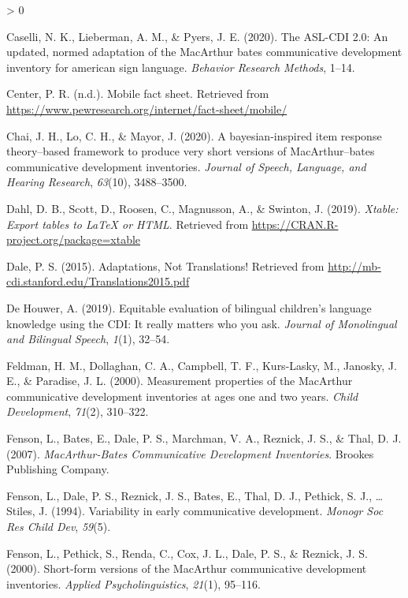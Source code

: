 \documentclass[
  english,
  ,man,floatsintext]{apa6}
\newlength{\cslhangindent}
\newenvironment{CSLReferences}[2] %
 {%
  \setlength{\parindent}{0pt}
  \ifodd #1 \everypar{\setlength{\hangindent}{\cslhangindent}}\ignorespaces\fi
  \ifnum #2 > 0
  \setlength{\parskip}{#2\baselineskip}
  \fi
 }%
 {}
\begin{document}
\begin{CSLReferences}{1}{0}
\leavevmode\hypertarget{ref-Caselli2020}{}%
Caselli, N. K., Lieberman, A. M., \& Pyers, J. E. (2020). The ASL-CDI 2.0: An updated, normed adaptation of the MacArthur bates communicative development inventory for american sign language. \emph{Behavior Research Methods}, 1--14.

\leavevmode\hypertarget{ref-Center2019}{}%
Center, P. R. (n.d.). Mobile fact sheet. Retrieved from \url{https://www.pewresearch.org/internet/fact-sheet/mobile/}

\leavevmode\hypertarget{ref-Chai2020}{}%
Chai, J. H., Lo, C. H., \& Mayor, J. (2020). A bayesian-inspired item response theory--based framework to produce very short versions of MacArthur--bates communicative development inventories. \emph{Journal of Speech, Language, and Hearing Research}, \emph{63}(10), 3488--3500.

\leavevmode\hypertarget{ref-R-xtable}{}%
Dahl, D. B., Scott, D., Roosen, C., Magnusson, A., \& Swinton, J. (2019). \emph{Xtable: Export tables to LaTeX or HTML}. Retrieved from \url{https://CRAN.R-project.org/package=xtable}

\leavevmode\hypertarget{ref-dale2015}{}%
Dale, P. S. (2015). {Adaptations, Not Translations!} Retrieved from \url{http://mb-cdi.stanford.edu/Translations2015.pdf}

\leavevmode\hypertarget{ref-DeHouwer2019}{}%
De Houwer, A. (2019). Equitable evaluation of bilingual children's language knowledge using the CDI: It really matters who you ask. \emph{Journal of Monolingual and Bilingual Speech}, \emph{1}(1), 32--54.

\leavevmode\hypertarget{ref-feldman2000}{}%
Feldman, H. M., Dollaghan, C. A., Campbell, T. F., Kurs-Lasky, M., Janosky, J. E., \& Paradise, J. L. (2000). Measurement properties of the MacArthur communicative development inventories at ages one and two years. \emph{Child Development}, \emph{71}(2), 310--322.

\leavevmode\hypertarget{ref-fenson2007}{}%
Fenson, L., Bates, E., Dale, P. S., Marchman, V. A., Reznick, J. S., \& Thal, D. J. (2007). \emph{Mac{A}rthur-{B}ates {C}ommunicative {D}evelopment {I}nventories}. Brookes Publishing Company.

\leavevmode\hypertarget{ref-fenson1994}{}%
Fenson, L., Dale, P. S., Reznick, J. S., Bates, E., Thal, D. J., Pethick, S. J., \ldots{} Stiles, J. (1994). Variability in early communicative development. \emph{Monogr Soc Res Child Dev}, \emph{59}(5).

\leavevmode\hypertarget{ref-fenson2000b}{}%
Fenson, L., Pethick, S., Renda, C., Cox, J. L., Dale, P. S., \& Reznick, J. S. (2000). Short-form versions of the MacArthur communicative development inventories. \emph{Applied Psycholinguistics}, \emph{21}(1), 95--116.


\end{CSLReferences}
\end{document}
